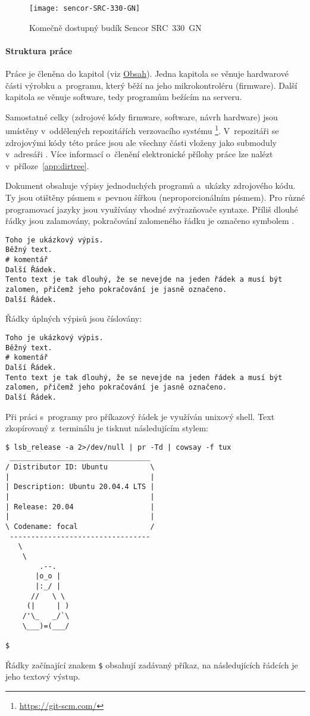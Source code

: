 \begin{figure}[htbp]
    \centering
    \texttt{[image: sencor-SRC-330-GN]}
    \caption{Komečně dostupný budík Sencor SRC~330~GN}
    \label{fig:sencor}
\end{figure}


\paragraph{Struktura práce}
Práce je členěna do kapitol (viz \hyperref[toc]{Obsah}). Jedna kapitola se
věnuje hardwarové části výrobku a~programu, který běží na jeho mikrokontroléru
(firmware).
Další kapitola se věnuje software, tedy programům bežícím na serveru.

Samostatné celky (zdrojové kódy firmware, software, návrh hardware) jsou
umístěny v~oddělených repozitářích verzovacího systému
\footnote{\url{https://git-scm.com/}}. V~repozitáři se zdrojovými
kódy této práce jsou ale všechny části vloženy jako submoduly v~adresáři
. Více informací o~členění elektronické přílohy práce lze
nalézt v~příloze~\vref{app:dirtree}.

Dokument obsahuje výpisy jednoduchých programů a~ukázky zdrojového kódu.
Ty jsou otištěny písmem s~pevnou šířkou (neproporcionálním písmem). Pro různé
programovací jazyky jsou využívány vhodné zvýrazňovače syntaxe. Příliš dlouhé
řádky jsou zalamovány, pokračování zalomeného řádku je označeno symbolem
\lstpostbreak{}.

\begin{lstlisting}[language=hashcomment]
Toho je ukázkový výpis.
Běžný text.
# komentář
Další Řádek.
Tento text je tak dlouhý, že se nevejde na jeden řádek a musí být zalomen, přičemž jeho pokračování je jasně označeno.
Další Řádek.
\end{lstlisting}

Řádky úplných výpisů jsou číslovány:
\begin{lstlisting}[language=hashcomment,style=numbers]
Toho je ukázkový výpis.
Běžný text.
# komentář
Další Řádek.
Tento text je tak dlouhý, že se nevejde na jeden řádek a musí být zalomen, přičemž jeho pokračování je jasně označeno.
Další Řádek.
\end{lstlisting}

Při práci s~programy pro příkazový řádek je využíván unixový shell.
Text zkopírovaný z~terminálu je tisknut následujícím stylem:
\begin{lstlisting}[style=terminal]
$ lsb_release -a 2>/dev/null | pr -Td | cowsay -f tux
 _________________________________
/ Distributor ID: Ubuntu          \
|                                 |
| Description: Ubuntu 20.04.4 LTS |
|                                 |
| Release: 20.04                  |
|                                 |
\ Codename: focal                 /
 ---------------------------------
   \
    \
        .--.
       |o_o |
       |:_/ |
      //   \ \
     (|     | )
    /'\_   _/`\
    \___)=(___/

$
\end{lstlisting}
Řádky začínající znakem \texttt{\$} obsahují zadávaný příkaz, na následujících
řádcích je jeho textový výstup.
